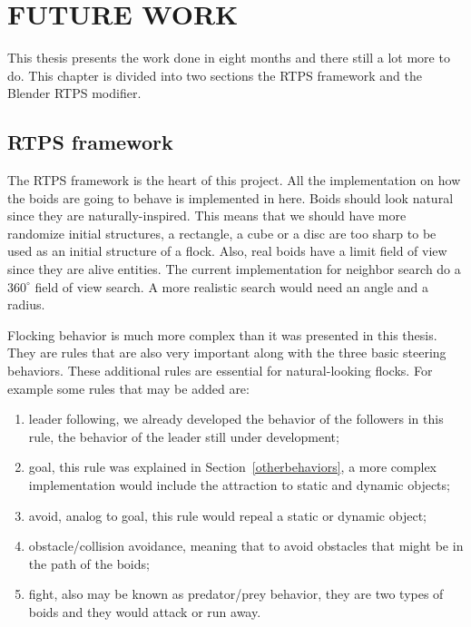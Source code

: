 \chapter{FUTURE WORK}\label{chap8}

This thesis presents the work done in eight months and there still a lot more to do. This chapter is  divided into two sections the RTPS framework and the Blender RTPS modifier.

\section{RTPS framework}

The RTPS framework is the heart of this project. All the implementation on how the boids are going to behave is implemented in here. Boids should look natural since they are naturally-inspired. This means that we should have more randomize initial structures, a rectangle, a cube or a disc are too sharp to be used as an initial structure of a flock. Also, real boids have a limit field of view since they are alive entities. The current implementation for neighbor search do a $360^{\circ}$ field of view search. A more realistic search would need an angle and a radius.

Flocking behavior is much more complex than it was presented in this thesis. They are rules that are also very important along with the three basic steering behaviors. These additional rules are essential for natural-looking flocks. For example some rules that may be added are: 

\begin{enumerate}
\item{leader following, we already developed the behavior of the followers in this rule, the behavior of the leader still under development;}
\item{goal, this rule was explained in Section~\ref{otherbehaviors}, a more complex implementation would include the attraction to static and dynamic objects;}
\item{avoid, analog to goal, this rule would repeal a static or dynamic object;} 
\item{obstacle/collision avoidance, meaning that to avoid obstacles that might be in the path of the boids;}
\item{fight, also may be known as predator/prey behavior, they are two types of boids and they would attack or run away.}
\end{enumerate}

